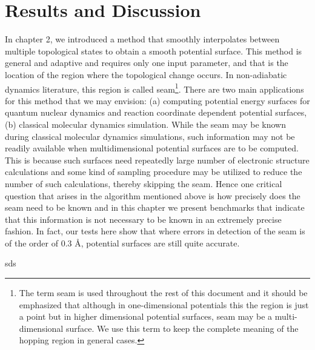 \chapter{Results and Discussion}
{\label {chapter3}}
In chapter 2, we introduced a method that smoothly interpolates between multiple topological
states to obtain a smooth potential surface. This method is general and adaptive and requires
only one input parameter, and that is the location of the region where the topological change
occurs. In non-adiabatic dynamics literature, this region is called seam\footnote{The term
seam is used throughout the rest of this document and it should be emphasized that although
in one-dimensional potentials this the region is just a point but in higher dimensional
potential surfaces, seam may be a multi-dimensional surface. We use this term to keep the
complete meaning of the hopping region in general cases.}. There are two main
applications for this method that we may envision: (a) computing
potential energy surfaces for quantum nuclear dynamics and reaction coordinate dependent
potential surfaces,(b) classical molecular dynamics simulation. While the seam may be known
during classical molecular dynamics simulations, such information may not be readily
available when multidimensional potential surfaces are to be computed. This is because such
surfaces need repeatedly large number of electronic structure calculations and some kind of
sampling procedure may be utilized to reduce the number of such calculations, thereby skipping
the seam. Hence one critical question that arises in the algorithm mentioned above is how
precisely does the seam need to be known and in this chapter we present benchmarks
that indicate that this information is not necessary to be known in an extremely precise
fashion. In fact, our tests here show that where errors in detection of the seam
is of the order of 0.3 \AA, potential surfaces are still quite accurate.



sds

